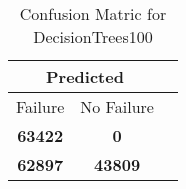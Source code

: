 \begin{table}[] 
\caption{Confusion Matric for DecisionTrees100} 
\label{Table: Prediction Accuracy-NoneDecisionTrees100SVMEKF-ignoresolarPanelDipole-solarPanelDipole} 
\centering 
\begin{tabular} 
 {@{}ccc@{}} 
\toprule 
\multicolumn{2}{c}{\textbf{Predicted}}
 \\ \midrule 
\multicolumn{1}{|c|}{Failure} & 
\multicolumn{1}{c|}{No Failure}
 \\ \midrule 
\multicolumn{1}{|c|}{\color{green}\textbf{63422}} & 
\multicolumn{1}{c|}{\color{red}\textbf{0}}
 \\ \midrule 
\multicolumn{1}{|c|}{\color{red}\textbf{62897}} & 
\multicolumn{1}{c|}{\color{green}\textbf{43809}}
 \\ \bottomrule 
\end{tabular} 
\end{table} 
